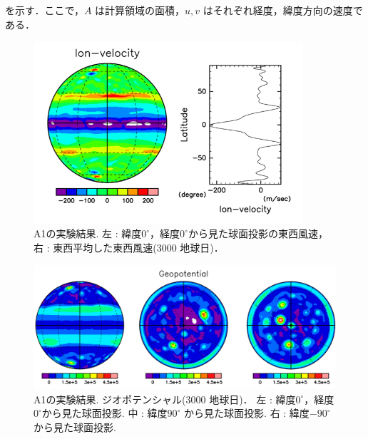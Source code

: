 \documentclass[a4j,12pt,openbib,oneside]{jreport}
\begin{document}
を示す．ここで，$A$ は計算領域の面積，$u, v$ はそれぞれ経度，緯度方向の速度である．
%
%
\begin{figure}[b]
  \begin{center}
    \includegraphics[clip,width=10cm]{./fig/result/A1/A1_1.png}
    \caption{
      \footnotesize{A1の実験結果. 左 : 緯度$0^\circ$，経度$0^\circ$から見た球面投影の東西風速，右 : 東西平均した東西風速(3000 地球日)．
      }
    }
    \label{fig:A1_1}
  \end{center}
\end{figure}
%
\begin{figure}[ht]
  \begin{center}
    \includegraphics[clip,width=12cm]{./fig/result/A1/A1_2.png}
    \caption{
      \footnotesize{A1の実験結果. ジオポテンシャル(3000 地球日)．
左 : 緯度$0^\circ$，経度$0^\circ$から見た球面投影.
中 : 緯度$90^\circ$ から見た球面投影.
右 : 緯度$-90^\circ$ から見た球面投影.
      }
    }
    \label{fig:A1_2}
  \end{center}
\end{figure}
\end{document}
